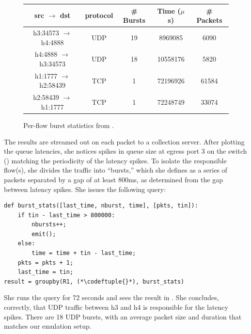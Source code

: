 \begin{figure}[t]
\vspace{0.083in}
\centering
\small
\begin{tabular}{c c c c c} \hline
\textbf{src $\rightarrow$ dst} & \textbf{protocol} & \textbf{\# Bursts} & \textbf{Time ($\mu$s)} & \textbf{\# Packets} \\ \hline \hline
h3:34573 $\rightarrow$ h4:4888 & UDP & 19 & 8969085 & 6090  \\ \hline
h4:4888 $\rightarrow$ h3:34573 & UDP & 18 & 10558176 & 5820 \\ \hline
h1:1777 $\rightarrow$ h2:58439 & TCP & 1 & 72196926 & 61584 \\ \hline
h2:58439 $\rightarrow$ h1:1777 & TCP & 1 & 72248749 & 33074 \\ \hline
\end{tabular}
\vspace{-0.1in}
\caption{Per-flow burst statistics from \TheSystem.}
\label{fig:mininet-flowstats}
\vspace{-0.1in}
\end{figure}

The results are streamed out on each packet to a collection server. After
plotting the queue latencies, she notices spikes in queue size at egress port 3
on the switch () matching the periodicity of the latency
spikes. To isolate the responsible flow(s), she divides the traffic into
``bursts,'' which she defines as a series of packets separated by a gap of at
least 800ms, as determined from the gap between latency spikes. She issues the
following \TheSystem query:

\begin{small}
\begin{lstlisting}
def burst_stats([last_time, nburst, time], [pkts, tin]):
    if tin - last_time > 800000:
        nbursts++;
        emit();
    else:
        time = time + tin - last_time;
    pkts = pkts + 1;
    last_time = tin;
result = groupby(R1, (*\codeftuple{}*), burst_stats)
\end{lstlisting}
\end{small}

She runs the query for 72 seconds and sees the result in
. She concludes, correctly, that UDP traffic between
{\ct h3} and {\ct h4} is responsible for the latency spikes.  There are 18 UDP
bursts, with an average packet size and duration
that matches our emulation setup.

